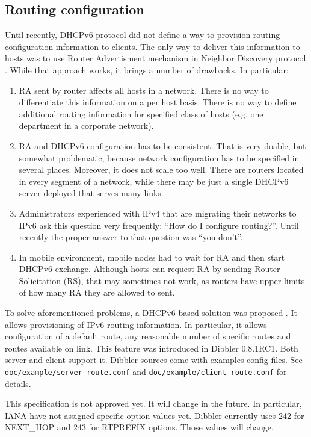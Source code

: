 \subsection{Routing configuration}
\label{feature-routing}
Until recently, DHCPv6 protocol did not define a way to provision
routing configuration information to clients. The only way to deliver
this information to hosts was to use Router Advertisment mechanism in
Neighbor Discovery protocol \cite{rfc4862}. While that approach works,
it brings a number of drawbacks. In particular:
\begin{enumerate}
\item RA sent by router affects all hosts in a network. There is no
way to differentiate this information on a per host basis. There is no
way to define additional routing information for specified class of
hosts (e.g. one department in a corporate network).
\item RA and DHCPv6 configuration has to be consistent. That is very
doable, but somewhat problematic, because network configuration has to
be specified in several places. Moreover, it does not scale too
well. There are routers located in every segment of a network, while
there may be just a single DHCPv6 server deployed that serves many links.
\item Administrators experienced with IPv4 that are migrating their
networks to IPv6 ask this question very frequently: ``How do I
configure routing?''. Until recently the proper answer to that
question was ``you don't''.
\item In mobile environment, mobile nodes had to wait for RA and then
start DHCPv6 exchange. Although hosts can request RA by sending Router
Solicitation (RS), that may sometimes not work, as routers have upper
limits of how many RA they are allowed to sent.
\end{enumerate}

To solve aforementioned problems, a DHCPv6-based solution was
proposed \cite{draft-route-option}. It allows provisioning of IPv6
routing information. In particular, it allows configuration of a
default route, any reasonable number of specific routes and routes
available on link. This feature was introduced in Dibbler
0.8.1RC1. Both server and client support it. Dibbler sources come with
examples config files. See \verb+doc/example/server-route.conf+
and \verb+doc/example/client-route.conf+ for details. 

\Note This specification is not approved yet. It will change in the
future. In particular, IANA have not assigned specific option values
yet. Dibbler currently uses 242 for NEXT\_HOP and 243 for RTPREFIX
options. Those values will change.

